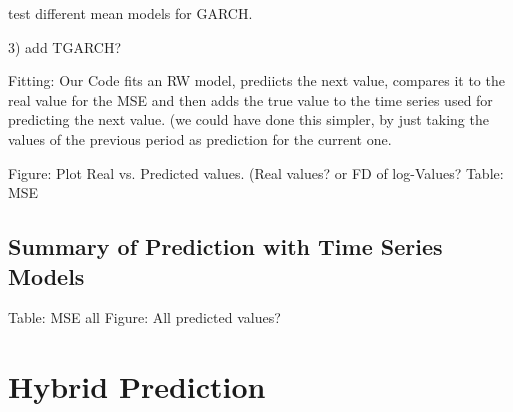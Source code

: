 \begin{table}[h]
    \centering
    
    \caption{}
    \label{tab:V_result_GARCH11_100}
\end{table}{}

\begin{table}[h]
    \centering
    
    \caption{}
    \label{tab:INTC_result_GARCH11_100}
\end{table}{}


test different mean models for GARCH. 




3) add TGARCH?






Fitting: 
Our Code fits an RW model, prediicts the next value, compares it to the real value for the MSE and then adds the true value to the time series used for predicting the next value. (we could have done this simpler, by just taking the values of the previous period as prediction for the current one. 

Figure: Plot Real vs. Predicted values. (Real values? or FD of log-Values?
Table: MSE





\subsection{Summary of Prediction with Time Series Models}
Table: MSE all
Figure: All predicted values?


\section{Hybrid Prediction}

